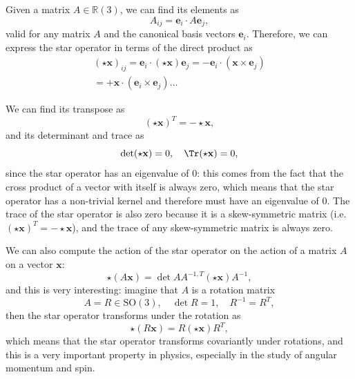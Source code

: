 Given a matrix \(A \in \mathbb{R}(3)\), we can find its elements as
\[
    A_{ij} = \mathbf{e}_i \cdot A \mathbf{e}_j,
\]
valid for any matrix \(A\) and the canonical basis vectors \(\mathbf{e}_i\). Therefore, we can express the star operator in terms of the direct product as
\[
    \begin{aligned}
        (\star \mathbf{x})_{ij} = \mathbf{e}_i \cdot (\star \mathbf{x}) \mathbf{e}_j = - \mathbf{e}_i \cdot (\mathbf{x} \times \mathbf{e}_j) \\
        = + \mathbf{x} \cdot (\mathbf{e}_i \times \mathbf{e}_j) \dots
    \end{aligned}
\]

We can find its transpose as
\[
    (\star \mathbf{x})^T = - \star \mathbf{x},
\]
and its determinant and trace as
\[
    \det(\star \mathbf{x}) = 0, \quad \Tr(\star \mathbf{x}) = 0,
\]
since the star operator has an eigenvalue of 0: this comes from the fact that the cross product of a vector with itself is always zero, which means that the star operator has a non-trivial kernel and therefore must have an eigenvalue of 0. The trace of the star operator is also zero because it is a skew-symmetric matrix (i.e. $(\star \mathbf{x})^T = -\star \mathbf{x}$), and the trace of any skew-symmetric matrix is always zero.

We can also compute the action of the star operator on the action of a matrix \(A\) on a vector \(\mathbf{x}\):
\[
    \star (A \mathbf{x}) = \det A A^{-1,T} (\star \mathbf{x}) A^{-1},
\]
and this is very interesting: imagine that \(A\) is a rotation matrix
\[
    A = R \in \mathrm{SO}(3), \quad \det R = 1, \quad R^{-1} = R^T,
\]
then the star operator transforms under the rotation as
\[
    \star (R \mathbf{x}) = R (\star \mathbf{x}) R^T,
\]
which means that the star operator transforms covariantly under rotations, and this is a very important property in physics, especially in the study of angular momentum and spin.

